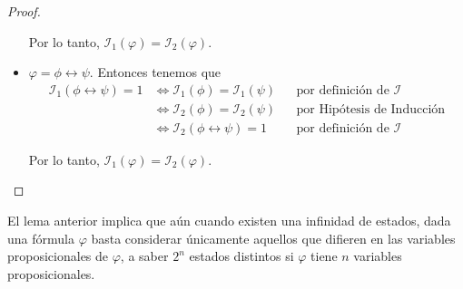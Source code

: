 \documentclass[letterpaper,12pt]{article}
\begin{document}
\begin{proof}
\begin{itemize}
            Por lo tanto, 
            $\mathcal{I}_{1}(\varphi) = \mathcal{I}_{2}(\varphi)$.

            \item $\varphi = \phi \leftrightarrow \psi$. Entonces tenemos que
            \begin{align*}
                \mathcal{I}_{1}(\phi \leftrightarrow \psi) = 1
                &\Leftrightarrow \mathcal{I}_{1}(\phi) = \mathcal{I}_{1}(\psi)
                && \text{por definición de $\mathcal{I}$} \\
                &\Leftrightarrow \mathcal{I}_{2}(\phi) = \mathcal{I}_{2}(\psi)
                && \text{por Hipótesis de Inducción} \\
                &\Leftrightarrow \mathcal{I}_{2}(\phi \leftrightarrow \psi) = 1
                && \text{por definición de $\mathcal{I}$}
            \end{align*}

            Por lo tanto, 
            $\mathcal{I}_{1}(\varphi) = \mathcal{I}_{2}(\varphi)$.

        \end{itemize}
    \end{proof}

    El lema anterior implica que aún cuando existen una infinidad de estados,
    dada una fórmula $\varphi$ basta considerar únicamente aquellos que 
    difieren en las variables proposicionales de $\varphi$, a saber $2^{n}$
    estados distintos si $\varphi$ tiene $n$ variables proposicionales.

\end{document}
